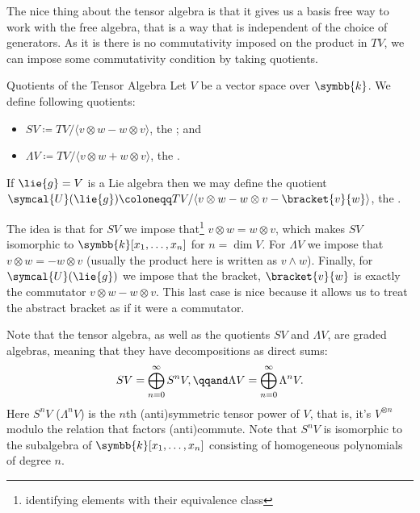 \documentclass[fleqn]{NotesClass}
\renewcommand{\field}{\symbb{k}}
\newcommand{\universalEnveloping}{\symcal{U}}
\begin{document}
    The nice thing about the tensor algebra is that it gives us a basis free way to work with the free algebra, that is a way that is independent of the choice of generators.
    As it is there is no commutativity imposed on the product in \(TV\), we can impose some commutativity condition by taking quotients.
    
    \begin{dfn}{Quotients of the Tensor Algebra}{}
        Let \(V\) be a vector space over \(\field\).
        We define following quotients:
        \begin{itemize}
            \item \(SV \coloneqq TV/\langle v \otimes w - w \otimes v \rangle\), the ; and
            \item \(\Lambda V \coloneqq TV/\langle v \otimes w + w \otimes v \rangle\), the .
        \end{itemize}
        If \(\lie{g} = V\) is a Lie algebra then we may define the quotient \(\universalEnveloping(\lie{g}) \coloneqq TV/\langle v \otimes w - w \otimes v - \bracket{v}{w} \rangle\), the .
    \end{dfn}
    
    The idea is that for \(SV\) we impose that\footnote{identifying elements with their equivalence class} \(v \otimes w = w \otimes v\), which makes \(SV\) isomorphic to \(\field[x_1, \dotsc, x_n]\) for \(n = \dim V\).
    For \(\Lambda V\) we impose that \(v \otimes w = -w\otimes v\) (usually the product here is written as \(v \wedge w\)).
    Finally, for \(\universalEnveloping(\lie{g})\) we impose that the bracket, \(\bracket{v}{w}\) is exactly the commutator \(v \otimes w - w \otimes v\).
    This last case is nice because it allows us to treat the abstract bracket as if it were a commutator.
    
    Note that the tensor algebra, as well as the quotients \(SV\) and \(\Lambda V\), are graded algebras, meaning that they have decompositions as direct sums:
    \begin{equation}
        SV = \bigoplus_{n = 0}^{\infty} S^nV, \qqand \Lambda V = \bigoplus_{n = 0}^{\infty} \Lambda^n V.
    \end{equation}
    Here \(S^nV\) (\(\Lambda^nV\)) is the \(n\)th (anti)symmetric tensor power of \(V\), that is, it's \(V^{\otimes n}\) modulo the relation that factors (anti)commute.
    Note that \(S^nV\) is isomorphic to the subalgebra of \(\field[x_1, \dotsc, x_n]\) consisting of homogeneous polynomials of degree \(n\).
    
    
    
    
%	

    \backmatter
    \renewcommand{\glossaryname}{Acronyms}
    \printglossary[acronym]
    \printindex
\end{document}
